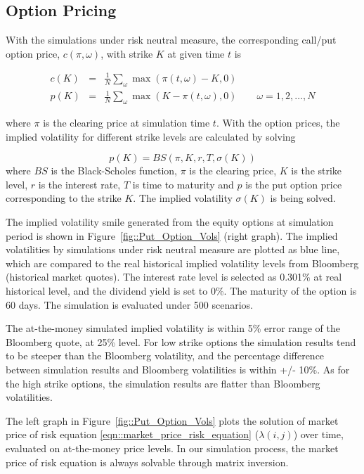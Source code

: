 \documentclass{article}
\begin{document}
\subsection{Option Pricing}

With the simulations under risk neutral measure, the corresponding call/put
option price, $c(\pi, \omega)$, with strike $K$ at given time $t$ is

\begin{eqnarray*}
c(K) &=& \frac{1}{N} \sum_{\omega} \max\left(\pi(t,\omega)-K,0\right) \\
p(K) &=& \frac{1}{N} \sum_{\omega} \max\left(K - \pi(t,\omega),0\right)
\qquad \omega = 1,2,\ldots,N
\end{eqnarray*}

where $\pi$ is the clearing price at simulation time $t$. With the option
prices, the implied volatility for different strike levels are calculated by
solving

\begin{equation*}
p(K)=BS(\pi ,K,r,T,\sigma (K))
\end{equation*}%
where $BS$ is the Black-Scholes function, $\pi $ is the clearing price, $K$
is the strike level, $r$ is the interest rate, $T$ is time to maturity and $%
p $ is the put option price corresponding to the strike $K$. The implied
volatility $\sigma (K)$ is being solved.

The implied volatility smile generated from the equity options at simulation
period is shown in Figure~\ref{fig::Put_Option_Vols} (right graph). The
implied volatilities by simulations under risk neutral measure are plotted
as blue line, which are compared to the real historical implied volatility
levels from Bloomberg (historical market quotes). The interest rate level
is selected as 0.301\% at real historical level, and the dividend yield
is set to 0\%. The maturity of the option is 60 days. The simulation is
evaluated under 500 scenarios.

The at-the-money simulated implied volatility is within 5\% error range of the Bloomberg
quote, at 25\% level. For low strike options the simulation results tend to
be steeper than the Bloomberg volatility, and the percentage difference
between simulation results and Bloomberg volatilities is within +/- 10\%. As
for the high strike options, the simulation results are flatter than
Bloomberg volatilities.

The left graph in Figure~\ref{fig::Put_Option_Vols} plots the solution of market price
of risk equation \ref{eqn::market_price_risk_equation} ($\lambda(i,j)$) over time, evaluated on at-the-money
price levels. In our simulation process, the market price of risk equation is always solvable through matrix
inversion.
\end{document}
